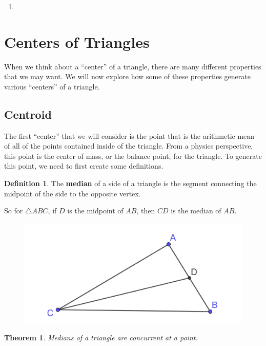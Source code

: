 \documentclass[
]{book}
\providecommand{\tightlist}{%
  \setlength{\itemsep}{0pt}\setlength{\parskip}{0pt}}
\newtheorem{theorem}{Theorem}[chapter]
\theoremstyle{definition}
\newtheorem{definition}{Definition}[chapter]
\theoremstyle{definition}
\theoremstyle{definition}
\theoremstyle{definition}
\theoremstyle{remark}
\begin{document}
\begin{enumerate}
\def\labelenumi{\arabic{enumi}.}
\tightlist
\item
\end{enumerate}

\hypertarget{centers-of-triangles}{%
\section{Centers of Triangles}\label{centers-of-triangles}}

When we think about a ``center'' of a triangle, there are many different properties that we may want. We will now explore how some of these properties generate various ``centers'' of a triangle.

\hypertarget{centroid}{%
\subsection{Centroid}\label{centroid}}

The first ``center'' that we will consider is the point that is the arithmetic mean of all of the points contained inside of the triangle. From a physics perspective, this point is the center of mass, or the balance point, for the triangle. To generate this point, we need to first create some definitions.

\begin{definition}
The \textbf{median} of a side of a triangle is the segment connecting the midpoint of the side to the opposite vertex.
\end{definition}

So for \(\triangle ABC\), if \(D\) is the midpoint of \(AB\), then \(CD\) is the median of \(AB\).

\begin{figure}

{\centering \includegraphics[width=0.3\linewidth]{images/median} 

}

\end{figure}

\begin{theorem}
Medians of a triangle are concurrent at a point.
\end{theorem}
\end{document}
